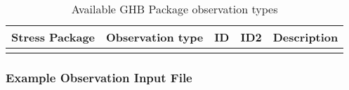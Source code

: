 \begin{longtable}{p{2cm} p{2.75cm} p{2cm} p{1.25cm} p{7cm}}
\caption{Available GHB Package observation types} \tabularnewline

\hline
\hline
\textbf{Stress Package} & \textbf{Observation type} & \textbf{ID} & \textbf{ID2} & \textbf{Description} \\
\hline
\endhead

\hline
\endfoot


\label{table:gwf-ghbobstype}
\end{longtable}

\vspace{5mm}
\subsubsection{Example Observation Input File}

